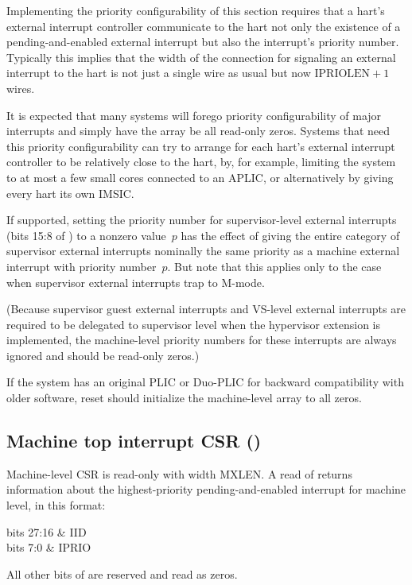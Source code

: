 \begin{commentary}
Implementing the priority configurability of this section requires
that a {\RISCV} hart's external interrupt controller communicate
to the hart not only the existence of a pending-and-enabled
external interrupt but also the interrupt's priority number.
Typically this implies that the width of the connection for signaling
an external interrupt to the hart is not just a single wire as usual
but now $\mbox{IPRIOLEN} + 1$ wires.

It is expected that many systems will forego
priority configurability of major interrupts and simply
have the\/  array be all read-only zeros.
Systems that need this priority configurability can try
to arrange for each hart's external interrupt controller
to be relatively close to the hart, by, for example, limiting
the system to at most a few small cores connected to an APLIC,
or alternatively by giving every hart its own IMSIC.
\end{commentary}

If supported, setting the priority number for supervisor-level external
interrupts (bits 15:8 of ) to a nonzero value~$p$ has the
effect of giving the entire category of supervisor external interrupts
nominally the same priority as a machine external interrupt with
priority number~$p$.
But note that this applies only to the case when supervisor external
interrupts trap to \mbox{M-mode}.

(Because supervisor guest external interrupts and VS-level external
interrupts are required to be delegated to supervisor level when the
hypervisor extension is implemented, the machine-level priority numbers
for these interrupts are always ignored and should be read-only zeros.)

If the system has an original PLIC or \mbox{Duo-PLIC} for backward
compatibility with older software, reset should initialize the
machine-level  array to all zeros.

\subsection{Machine top interrupt CSR ()}
\label{sec:mtopi}

Machine-level CSR  is read-only with width MXLEN.
A read of  returns information about the highest-priority
pending-and-enabled interrupt for machine level, in this
format:\nopagebreak
\begin{displayLinesTable}[l@{\quad}l]
bits 27:16 & IID \\
bits 7:0   & IPRIO \\
\end{displayLinesTable}
All other bits of  are reserved and read as zeros.

